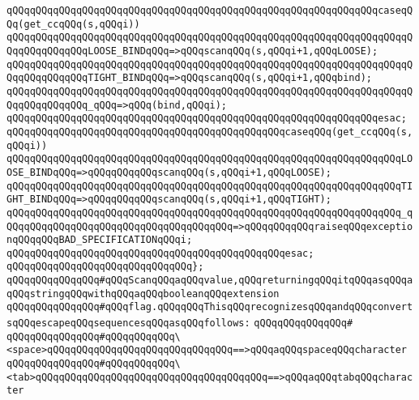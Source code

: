 \verb|qQQqqQQqqQQqqQQqqQQqqQQqqQQqqQQqqQQqqQQqqQQqqQQqqQQqqQQqqQQqqQQqcaseqQQq(get_ccqQQq(s,qQQqi))|\newline
\verb|qQQqqQQqqQQqqQQqqQQqqQQqqQQqqQQqqQQqqQQqqQQqqQQqqQQqqQQqqQQqqQQqqQQqqQQqqQQqqQQqqQQqLOOSE_BINDqQQq=>qQQqscanqQQq(s,qQQqi+1,qQQqLOOSE);|\newline
\verb|qQQqqQQqqQQqqQQqqQQqqQQqqQQqqQQqqQQqqQQqqQQqqQQqqQQqqQQqqQQqqQQqqQQqqQQqqQQqqQQqqQQqTIGHT_BINDqQQq=>qQQqscanqQQq(s,qQQqi+1,qQQqbind);|\newline
\verb|qQQqqQQqqQQqqQQqqQQqqQQqqQQqqQQqqQQqqQQqqQQqqQQqqQQqqQQqqQQqqQQqqQQqqQQqqQQqqQQqqQQq_qQQq=>qQQq(bind,qQQqi);|\newline
\verb|qQQqqQQqqQQqqQQqqQQqqQQqqQQqqQQqqQQqqQQqqQQqqQQqqQQqqQQqqQQqqQQqesac;|\newline
\newline
\newline
\verb|qQQqqQQqqQQqqQQqqQQqqQQqqQQqqQQqqQQqqQQqqQQqqQQqcaseqQQq(get_ccqQQq(s,qQQqi))|\newline
\verb|qQQqqQQqqQQqqQQqqQQqqQQqqQQqqQQqqQQqqQQqqQQqqQQqqQQqqQQqqQQqqQQqqQQqLOOSE_BINDqQQq=>qQQqqQQqqQQqscanqQQq(s,qQQqi+1,qQQqLOOSE);|\newline
\verb|qQQqqQQqqQQqqQQqqQQqqQQqqQQqqQQqqQQqqQQqqQQqqQQqqQQqqQQqqQQqqQQqqQQqTIGHT_BINDqQQq=>qQQqqQQqqQQqscanqQQq(s,qQQqi+1,qQQqTIGHT);|\newline
\newline
\verb|qQQqqQQqqQQqqQQqqQQqqQQqqQQqqQQqqQQqqQQqqQQqqQQqqQQqqQQqqQQqqQQqqQQq_qQQqqQQqqQQqqQQqqQQqqQQqqQQqqQQqqQQqqQQq=>qQQqqQQqqQQqraiseqQQqexceptionqQQqqQQqBAD_SPECIFICATIONqQQqi;|\newline
\verb|qQQqqQQqqQQqqQQqqQQqqQQqqQQqqQQqqQQqqQQqqQQqqQQqesac;|\newline
\verb|qQQqqQQqqQQqqQQqqQQqqQQqqQQqqQQq};|\newline
\newline
\verb|qQQqqQQqqQQqqQQq#qQQqScanqQQqaqQQqvalue,qQQqreturningqQQqitqQQqasqQQqaqQQqstringqQQqwithqQQqaqQQqbooleanqQQqextension|\newline
\verb|qQQqqQQqqQQqqQQq#qQQqflag.qQQqqQQqThisqQQqrecognizesqQQqandqQQqconvertsqQQqescapeqQQqsequencesqQQqasqQQqfollows:|\newline
\verb|qQQqqQQqqQQqqQQq#|\newline
\verb|qQQqqQQqqQQqqQQq#qQQqqQQqqQQq\<space>qQQqqQQqqQQqqQQqqQQqqQQqqQQqqQQq==>qQQqaqQQqspaceqQQqcharacter|\newline
\verb|qQQqqQQqqQQqqQQq#qQQqqQQqqQQq\<tab>qQQqqQQqqQQqqQQqqQQqqQQqqQQqqQQqqQQqqQQq==>qQQqaqQQqtabqQQqcharacter|\newline
